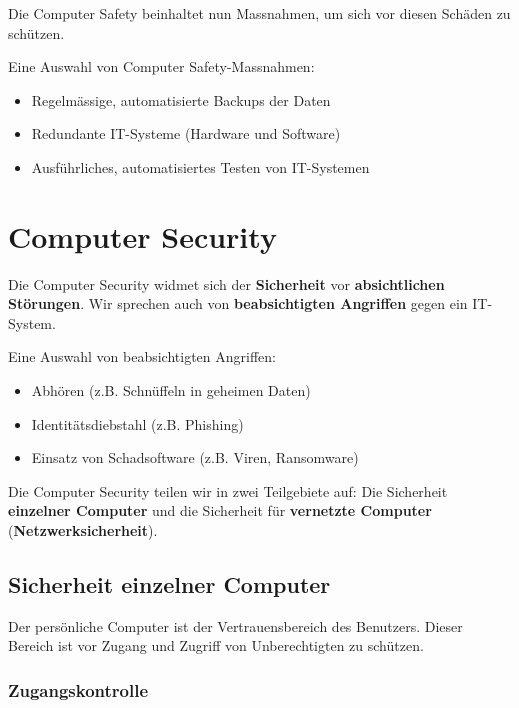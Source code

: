 Die Computer Safety beinhaltet nun Massnahmen, um sich vor diesen Schäden zu schützen.

\begin{example}
Eine Auswahl von Computer Safety-Massnahmen:
\begin{itemize}
\item Regelmässige, automatisierte Backups der Daten
\item Redundante \ac{IT}-Systeme (Hardware und Software)
\item Ausführliches, automatisiertes Testen von \ac{IT}-Systemen
\end{itemize}
\end{example}

\section{Computer Security}

Die Computer Security widmet sich der \textbf{Sicherheit} vor \textbf{absichtlichen Störungen}. Wir sprechen auch von \textbf{beabsichtigten Angriffen} gegen ein \ac{IT}-System.

\begin{example}
Eine Auswahl von beabsichtigten Angriffen:
\begin{itemize}
\item Abhören (z.B. Schnüffeln in geheimen Daten)
\item Identitätsdiebstahl (z.B. Phishing)
\item Einsatz von Schadsoftware (z.B. Viren, Ransomware)
\end{itemize}
\end{example}

Die Computer Security teilen wir in zwei Teilgebiete auf: Die Sicherheit \textbf{einzelner Computer} und die Sicherheit für \textbf{vernetzte Computer} (\textbf{Netzwerksicherheit}).

\subsection{Sicherheit einzelner Computer}

Der persönliche Computer ist der Vertrauensbereich des Benutzers. Dieser Bereich ist vor Zugang und Zugriff von Unberechtigten zu schützen.

\subsubsection{Zugangskontrolle}

